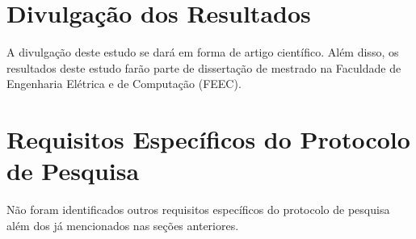 \documentclass[a4paper,11pt,titlepage,singlespacing]{article}
\begin{document}
\section{Divulgação dos Resultados}
A divulgação deste estudo se dará em forma de artigo científico. Além disso, os resultados deste estudo farão parte de dissertação de mestrado na Faculdade de Engenharia Elétrica e de Computação (FEEC).

\section{Requisitos Específicos do Protocolo de Pesquisa}
Não foram identificados outros requisitos específicos do protocolo de pesquisa além dos já mencionados nas seções anteriores.






\newpage
{}

\end{document}
